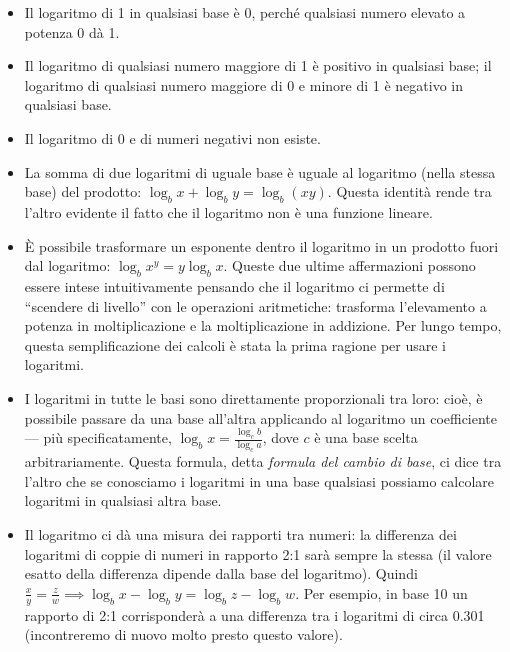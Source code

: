 \begin{itemize}

\item Il logaritmo di 1 in qualsiasi base è 0, perché qualsiasi numero elevato a potenza 0 dà 1.

\item Il logaritmo di qualsiasi numero maggiore di 1 è positivo in qualsiasi base; il logaritmo di qualsiasi numero maggiore di 0 e minore di 1 è negativo in qualsiasi base.

\item Il logaritmo di 0 e di numeri negativi non esiste.

\item La somma di due logaritmi di uguale base è uguale al logaritmo (nella stessa base) del prodotto: $\log _b x + \log _b y = \log _b (xy)$. Questa identità rende tra l'altro evidente il fatto che il logaritmo non è una funzione lineare. 

\item È possibile trasformare un esponente dentro il logaritmo in un prodotto fuori dal logaritmo: $\log _b x^y = y \log _b x$. Queste due ultime affermazioni possono essere intese intuitivamente pensando che il logaritmo ci permette di ``scendere di livello'' con le operazioni aritmetiche: trasforma l'elevamento a potenza in moltiplicazione e la moltiplicazione in addizione. Per lungo tempo, questa semplificazione dei calcoli è stata la prima ragione per usare i logaritmi.

\item I logaritmi in tutte le basi sono direttamente proporzionali tra loro: cioè, è possibile passare da una base all'altra applicando al logaritmo un coefficiente --- più specificatamente, $\log _b x = \frac{\log _c b}{\log _c a}$, dove $c$ è una base scelta arbitrariamente. Questa formula, detta \emph{formula del cambio di base}, ci dice tra l'altro che se conosciamo i logaritmi in una base qualsiasi possiamo calcolare logaritmi in qualsiasi altra base.

\item Il logaritmo ci dà una misura dei rapporti tra numeri: la differenza dei logaritmi di coppie di numeri in rapporto 2:1 sarà sempre la stessa (il valore esatto della differenza dipende dalla base del logaritmo). Quindi $\frac{x}{y} = \frac{z}{w} \implies \log _b x - \log _b y = \log _b z - \log _b w$. Per esempio, in base 10 un rapporto di 2:1 corrisponderà a una differenza tra i logaritmi di circa 0.301 (incontreremo di nuovo molto presto questo valore). 


\end{itemize}
